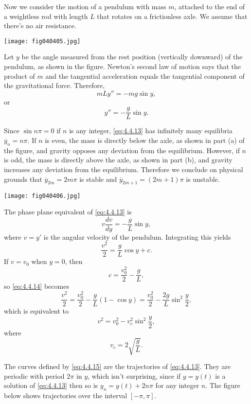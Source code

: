 \documentclass{ximera}
\begin{document}
\begin{example}\label{example:4.4.2}
Now we
consider the motion of a pendulum with mass $m$, attached to the end
of a weightless rod with length $L$ that rotates on a frictionless
axle. We assume that there's no air
resistance.
 
\begin{image}
 \texttt{[image: fig040405.jpg]}
\end{image}
 
 
Let $y$ be the angle measured from the rest position
(vertically downward) of the pendulum, as shown in
the figure. Newton's second law of motion says that the
product of $m$ and the tangential acceleration equals the tangential
component of the gravitational force.  Therefore,
$$
mLy''=-mg\sin y,
$$
or
\begin{equation} \label{eq:4.4.13}
y''=-\frac{g}{L} \sin y.
\end{equation}
 
 
Since $\sin n\pi=0$ if $n$ is any integer,  \eqref{eq:4.4.13} has
infinitely many equilibria $\overline{y}_n=n\pi$. If $n$ is
even, the mass is directly below the axle, as shown in part (a) of the figure, and gravity opposes any deviation
from the equilibrium. However, if $n$ is odd, the mass is directly
above the axle, as shown in part (b), and gravity
increases any deviation from the equilibrium. Therefore we conclude
on physical grounds that $\overline{y}_{2m}=2m\pi$ is stable and
$\overline{y}_{2m+1}=(2m+1)\pi$ is unstable.
 
 
\begin{image}
 \texttt{[image: fig040406.jpg]}
\end{image}
 
 
The phase plane equivalent of \eqref{eq:4.4.13} is
$$
v\frac{dv}{dy}=-\frac{g}{L}\sin y,
$$
where $v=y'$ is the angular velocity of the pendulum. Integrating this
yields
\begin{equation} \label{eq:4.4.14}
\frac{v^2}{2}=\frac{g}{L}\cos y+c.
\end{equation}
If $v=v_0$ when $y=0$, then
$$
c=\frac{v_0^2}{2}-\frac{g}{L},
$$
so \eqref{eq:4.4.14} becomes
$$
\frac{v^2}{2}=\frac{v_0^2}{2}-\frac{g}{L}(1-\cos y)
=\frac{v_0^2}{2}-\frac{2g}{L}\sin^2\frac{y}{2},
$$
which is equivalent to
\begin{equation} \label{eq:4.4.15}
v^2=v_0^2-v_c^2\sin^2\frac{y}{2},
\end{equation}
 where
$$
v_c=2\sqrt{\frac{g}{L}}.
$$
 
The curves defined by \eqref{eq:4.4.15} are the trajectories of
\eqref{eq:4.4.13}. They are periodic with period $2\pi$ in $y$, which isn't
 surprising, since if $y=y(t)$ is a solution of \eqref{eq:4.4.13} then
so is $y_n=y(t)+2n\pi$ for any integer $n$. The figure below
shows trajectories over the interval $[-\pi,\pi]$.
 

\end{example}
\end{document}
